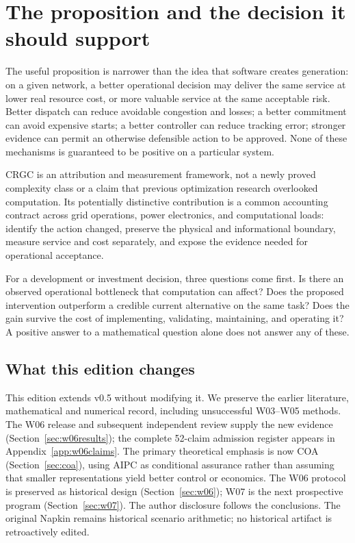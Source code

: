 \documentclass[11pt,letterpaper]{article}
\begin{document}
\section{The proposition and the decision it should support}
\label{sec:proposition}
The useful proposition is narrower than the idea that software creates generation: on a given network, a better operational decision may deliver the same service at lower real resource cost, or more valuable service at the same acceptable risk. Better dispatch can reduce avoidable congestion and losses; a better commitment can avoid expensive starts; a better controller can reduce tracking error; stronger evidence can permit an otherwise defensible action to be approved. None of these mechanisms is guaranteed to be positive on a particular system.

CRGC is an attribution and measurement framework, not a newly proved complexity class or a claim that previous optimization research overlooked computation. Its potentially distinctive contribution is a common accounting contract across grid operations, power electronics, and computational loads: identify the action changed, preserve the physical and informational boundary, measure service and cost separately, and expose the evidence needed for operational acceptance.

For a development or investment decision, three questions come first. Is there an observed operational bottleneck that computation can affect? Does the proposed intervention outperform a credible current alternative on the same task? Does the gain survive the cost of implementing, validating, maintaining, and operating it? A positive answer to a mathematical question alone does not answer any of these.

\subsection{What this edition changes}
This edition extends v0.5 without modifying it. We preserve the earlier literature, mathematical and numerical record, including unsuccessful W03--W05 methods. The W06 release and subsequent independent review supply the new evidence (Section~\ref{sec:w06results}); the complete 52-claim admission register appears in Appendix~\ref{app:w06claims}. The primary theoretical emphasis is now COA (Section~\ref{sec:coa}), using AIPC as conditional assurance rather than assuming that smaller representations yield better control or economics. The W06 protocol is preserved as historical design (Section~\ref{sec:w06}); W07 is the next prospective program (Section~\ref{sec:w07}). The author disclosure follows the conclusions. The original Napkin remains historical scenario arithmetic; no historical artifact is retroactively edited.\cite{chatbranch,workbranch,w03packet,w03review,w04packet,w05packet,w05review,w06packet,w06review}
\end{document}
